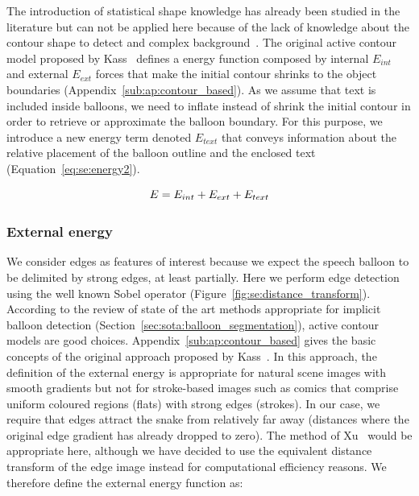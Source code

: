 The introduction of statistical shape knowledge has already been studied in the literature but can not be applied here because of the lack of knowledge about the contour shape to detect and complex background~\cite{Cremers2002}.
The original active contour model proposed by Kass~\cite{Kass1988} defines a energy function composed by internal $E_{int}$ and external $E_{ext}$ forces that make the initial contour shrinks to the object boundaries (Appendix~\ref{sub:ap:contour_based}).
As we assume that text is included inside balloons, we need to inflate instead of shrink the initial contour in order to retrieve or approximate the balloon boundary.
For this purpose, we introduce a new energy term denoted $E_{text}$ that conveys information about the relative placement of the balloon outline and the enclosed text (Equation~\ref{eq:se:energy2}).

\begin{equation}\label{eq:se:energy2}
  E = E_{int} + E_{ext} + E_{text}\\
\end{equation}

\subsubsection{External energy}
\label{sec:se:external_energie}

We consider edges as features of interest because we expect the speech balloon to be delimited by strong edges, at least partially.
Here we perform edge detection using the well known Sobel operator (Figure~\ref{fig:se:distance_transform}).
According to the review of state of the art methods appropriate for implicit balloon detection (Section~\ref{sec:sota:balloon_segmentation}), active contour models are good choices.
Appendix~\ref{sub:ap:contour_based} gives the basic concepts of the original approach proposed by Kass~\cite{Kass1988}.
In this approach, the definition of the external energy is appropriate for natural scene images with smooth gradients but not for stroke-based images such as comics that comprise uniform coloured regions (flats) with strong edges (strokes).
In our case, we require that edges attract the snake from relatively far away (distances where the original edge gradient has already dropped to zero).
The method of Xu~\cite{Xu1998} would be appropriate here, although we have decided to use the equivalent distance transform of the edge image instead for computational efficiency reasons.
We therefore define the external energy function as:

